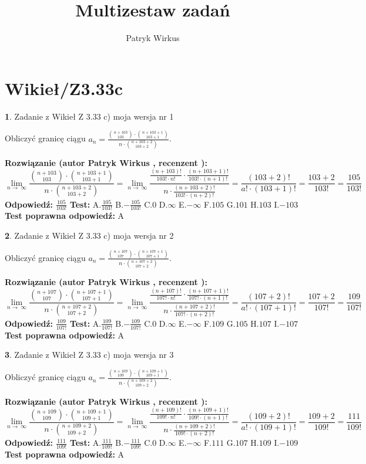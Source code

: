 \documentclass[12pt, a4paper]{article}
\title{Multizestaw zadań}
\author{Patryk Wirkus}
\date{}
\theoremstyle{definition} %
\newtheorem{zad}{}
\newcommand{\kategoria}[1]{\section{#1}}
\newcommand{\zadStart}[1]{\begin{zad}#1\newline}
\newcommand{\zadStop}{\end{zad}}
\newcommand{\rozwStart}[2]{\noindent \textbf{Rozwiązanie (autor #1 , recenzent #2): }\newline}
\newcommand{\rozwStop}{\newline}
\newcommand{\odpStart}{\noindent \textbf{Odpowiedź:}\newline}
\newcommand{\odpStop}{\newline}
\newcommand{\testStart}{\noindent \textbf{Test:}\newline}
\newcommand{\testStop}{\newline}
\newcommand{\kluczStart}{\noindent \textbf{Test poprawna odpowiedź:}\newline}
\newcommand{\kluczStop}{\newline}
\begin{document}
\maketitle

\kategoria{Wikieł/Z3.33c}


\zadStart{Zadanie z Wikieł Z 3.33 c) moja wersja nr 1}

Obliczyć granicę ciągu $a_{n}=\frac{{n+103\choose103}\cdot{n+103+1\choose103+1}}{n\cdot{n+103+2\choose103+2}}$.
\zadStop
\rozwStart{Patryk Wirkus}{}
$$\lim\limits_{n\to\ \infty}\frac{{n+103\choose103}\cdot{n+103+1\choose103+1}}{n\cdot{n+103+2\choose103+2}} = \lim\limits_{n\to\ \infty}\frac{\frac{(n+103)!}{103! \cdot n!}\cdot \frac{(n+103+1)!}{103! \cdot (n+1)!}}{n\cdot \frac{(n+103+2)!}{103! \cdot (n+2)!}} = \frac{(103+2)!}{a!\cdot (103+1)!} = \frac{103+2}{103!} = \frac{105}{103!}$$
\rozwStop
\odpStart
$\frac{105}{103!}$
\odpStop
\testStart
A.$\frac{105}{103!}$ B.$-\frac{105}{103!}$ C.$0$ D.$\infty$ E.$-\infty$
F.$105$ G.$101$
H.$103$
I.$-103$
\testStop
\kluczStart
A
\kluczStop



\zadStart{Zadanie z Wikieł Z 3.33 c) moja wersja nr 2}

Obliczyć granicę ciągu $a_{n}=\frac{{n+107\choose107}\cdot{n+107+1\choose107+1}}{n\cdot{n+107+2\choose107+2}}$.
\zadStop
\rozwStart{Patryk Wirkus}{}
$$\lim\limits_{n\to\ \infty}\frac{{n+107\choose107}\cdot{n+107+1\choose107+1}}{n\cdot{n+107+2\choose107+2}} = \lim\limits_{n\to\ \infty}\frac{\frac{(n+107)!}{107! \cdot n!}\cdot \frac{(n+107+1)!}{107! \cdot (n+1)!}}{n\cdot \frac{(n+107+2)!}{107! \cdot (n+2)!}} = \frac{(107+2)!}{a!\cdot (107+1)!} = \frac{107+2}{107!} = \frac{109}{107!}$$
\rozwStop
\odpStart
$\frac{109}{107!}$
\odpStop
\testStart
A.$\frac{109}{107!}$ B.$-\frac{109}{107!}$ C.$0$ D.$\infty$ E.$-\infty$
F.$109$ G.$105$
H.$107$
I.$-107$
\testStop
\kluczStart
A
\kluczStop



\zadStart{Zadanie z Wikieł Z 3.33 c) moja wersja nr 3}

Obliczyć granicę ciągu $a_{n}=\frac{{n+109\choose109}\cdot{n+109+1\choose109+1}}{n\cdot{n+109+2\choose109+2}}$.
\zadStop
\rozwStart{Patryk Wirkus}{}
$$\lim\limits_{n\to\ \infty}\frac{{n+109\choose109}\cdot{n+109+1\choose109+1}}{n\cdot{n+109+2\choose109+2}} = \lim\limits_{n\to\ \infty}\frac{\frac{(n+109)!}{109! \cdot n!}\cdot \frac{(n+109+1)!}{109! \cdot (n+1)!}}{n\cdot \frac{(n+109+2)!}{109! \cdot (n+2)!}} = \frac{(109+2)!}{a!\cdot (109+1)!} = \frac{109+2}{109!} = \frac{111}{109!}$$
\rozwStop
\odpStart
$\frac{111}{109!}$
\odpStop
\testStart
A.$\frac{111}{109!}$ B.$-\frac{111}{109!}$ C.$0$ D.$\infty$ E.$-\infty$
F.$111$ G.$107$
H.$109$
I.$-109$
\testStop
\kluczStart
A
\kluczStop
\end{document}
